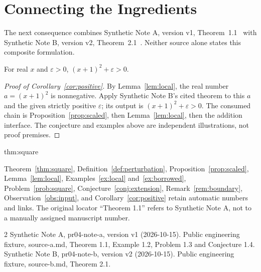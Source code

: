 \documentclass[12pt,reqno]{amsart}
\begin{document}
\section{Connecting the Ingredients}
The next consequence combines Synthetic Note A, version v1,
Theorem~1.1~\cite[Theorem~1.1]{note-a} with Synthetic Note B, version v2,
Theorem~2.1~\cite[Theorem~2.1]{note-b}. Neither source alone states this
composite formulation.
\begin{corollary}\label{cor:positive}
For real $x$ and $\varepsilon>0$, $(x+1)^2+\varepsilon>0$.
\end{corollary}
\begin{proof}[Proof of Corollary~\ref{cor:positive}]
By Lemma~\ref{lem:local}, the real number $a=(x+1)^2$ is nonnegative.
Apply Synthetic Note B's cited theorem to this $a$ and the given strictly
positive $\varepsilon$; its output is $(x+1)^2+\varepsilon>0$.
The consumed chain is Proposition~\ref{prop:scaled}, then
Lemma~\ref{lem:local}, then the addition interface. The conjecture and
examples above are independent illustrations, not proof premises.
\end{proof}
\begin{theoremrecall}{thm:square}

\end{theoremrecall}
Theorem~\ref{thm:square}, Definition~\ref{def:perturbation},
Proposition~\ref{prop:scaled}, Lemma~\ref{lem:local},
Examples~\ref{ex:local} and~\ref{ex:borrowed}, Problem~\ref{prob:square},
Conjecture~\ref{conj:extension}, Remark~\ref{rem:boundary},
Observation~\ref{obs:input}, and Corollary~\ref{cor:positive}
retain automatic numbers and links. The original locator ``Theorem 1.1''
refers to Synthetic Note A, not to a manually assigned manuscript number.
\begin{thebibliography}{2}
 Synthetic Note A, pr04-note-a, version v1 (2026-10-15).
Public engineering fixture, source-a.md, Theorem 1.1, Example 1.2,
Problem 1.3 and Conjecture 1.4.
 Synthetic Note B, pr04-note-b, version v2 (2026-10-15).
Public engineering fixture, source-b.md, Theorem 2.1.
\end{thebibliography}
\end{document}
